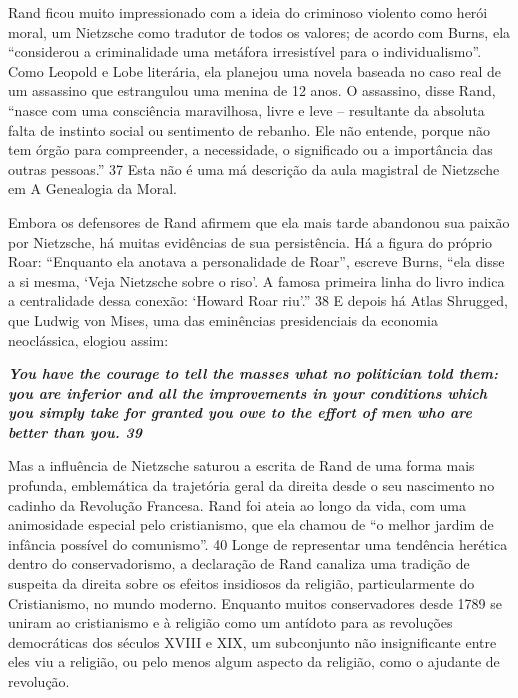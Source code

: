  
\par
 
Rand ficou muito impressionado com a ideia do criminoso violento como herói moral, um Nietzsche como tradutor de todos os valores; de acordo com Burns, ela “considerou a criminalidade uma metáfora irresistível para o individualismo”. Como Leopold e Lobe literária, ela planejou uma novela baseada no caso real de um assassino que estrangulou uma menina de 12 anos. O assassino, disse Rand, “nasce com uma consciência maravilhosa, livre e leve – resultante da absoluta falta de instinto social ou sentimento de rebanho. Ele não entende, porque não tem órgão para compreender, a necessidade, o significado ou a importância das outras pessoas.”
 {\color{blue} 37}  
Esta não é uma má descrição da aula magistral de Nietzsche em A Genealogia da Moral.
 
\par
 
Embora os defensores de Rand afirmem que ela mais tarde abandonou sua paixão por Nietzsche, há muitas evidências de sua persistência. Há a figura do próprio Roar: “Enquanto ela anotava a personalidade de Roar”, escreve Burns, “ela disse a si mesma, ‘Veja Nietzsche sobre o riso’. A famosa primeira linha do livro indica a centralidade dessa conexão: ‘Howard Roar riu’.”
 {\color{blue} 38}  
E depois há Atlas Shrugged, que Ludwig von Mises, uma das eminências presidenciais da economia neoclássica, elogiou assim:
 
\par
 

 \textbf{\textit{You have the courage to tell the masses what no politician told them: you are inferior and all the improvements in your conditions which you simply take for granted you owe to the effort of men who are better than you. {{\color{blue} 39} } } }  
 
 
\par
 
Mas a influência de Nietzsche saturou a escrita de Rand de uma forma mais profunda, emblemática da trajetória geral da direita desde o seu nascimento no cadinho da Revolução Francesa. Rand foi ateia ao longo da vida, com uma animosidade especial pelo cristianismo, que ela chamou de “o melhor jardim de infância possível do comunismo”.
 {\color{blue} 40}  
Longe de representar uma tendência herética dentro do conservadorismo, a declaração de Rand canaliza uma tradição de suspeita da direita sobre os efeitos insidiosos da religião, particularmente do Cristianismo, no mundo moderno. Enquanto muitos conservadores desde 1789 se uniram ao cristianismo e à religião como um antídoto para as revoluções democráticas dos séculos XVIII e XIX, um subconjunto não insignificante entre eles viu a religião, ou pelo menos algum aspecto da religião, como o ajudante de revolução.
 

